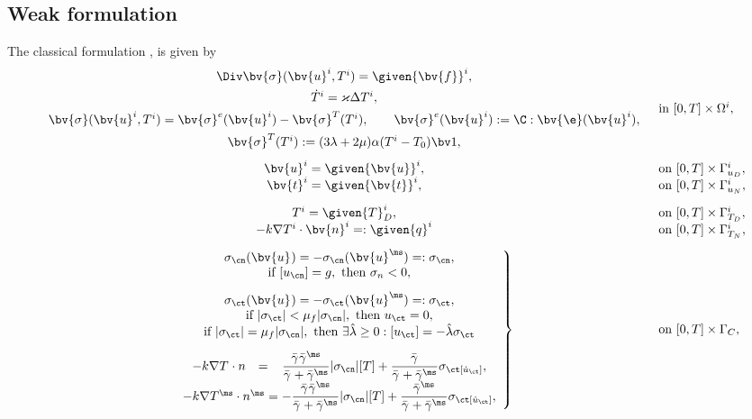 \subsection{Weak formulation} \label{sec:Weak}
The classical formulation \cite{JoKl93}, \cite{WrMi94} is given by
\begin{equation} \label{ClassicalForm}
  \begin{array}{cl}
   \begin{array}{c}
    \Div \bv{\sigma} (\bv{u}^i, T^i) = \given{\bv{f}}^i, \\ [1ex]
    \dot T^i = \varkappa \Delta T^i,    \\[1ex]
    \bv{\sigma}(\bv{u}^i, T^i) = \bv{\sigma}^e(\bv{u}^i) - \bv{\sigma}^T(T^i), \qquad 
            \bv{\sigma}^e(\bv{u}^i) := \C:\bv{\e}(\bv{u}^i), \\[1ex]
    \bv{\sigma}^T(T^i) :=  (3 \lambda + 2 \mu) \alpha (T^i-T_0) \bv 1,
   \end{array}  &\mbox{in } [0,T]\times\Omega^i, \\[8ex]
    \bv{u}^i = \given{\bv{u}}^i,&\mbox{on }[0,T]\times\Gamma_{u_D}^i, \\
    \bv{t}^i = \given{\bv{t}}^i,&\mbox{on }[0,T]\times\Gamma_{u_N}^i, \\[2ex]
    T^i = \given{T}_D^i,&\mbox{on }[0,T]\times\Gamma_{T_D}^i, \\
    -k\nabla T^i \cdot \bv{n}^i =: \given{q}^i&\mbox{on }[0,T]\times\Gamma_{T_N}^i, \\[2ex]
\left. 
   \begin{array}{c}
    \sigma_\cn(\bv{u}^{\sl})=-\sigma_\cn(\bv{u}^{\ms})=:\sigma_\cn, \\
    \mbox{if } [u_{\cn}]=g, \mbox{ then } \sigma_n < 0, \\[2ex]
    \sigma_\ct(\bv{u}^{\sl})=-\sigma_\ct(\bv{u}^{\ms})=:\sigma_\ct, \\
    \mbox{if } |\sigma_\ct| < \mu_f |\sigma_\cn|, \mbox{ then } u_\ct = 0,\\
    \mbox{if } |\sigma_\ct| = \mu_f |\sigma_\cn|, \mbox{ then } \exists \hat \lambda \geq 0: [u_\ct] = - \hat \lambda \sigma_\ct \\[2ex]
    -k\nabla T^{\sl} \cdot n^{\sl} \,\,\,\,
      = \,\,\,\,\, \dfrac{\bar{\gamma}^{\sl} \bar{\gamma}^{\ms}}{\bar{\gamma}^{\sl} + \bar{\gamma}^{\ms}} |\sigma_\cn| [T] 
        + \dfrac{\bar{\gamma}^{\sl}}{\bar{\gamma}^{\sl} + \bar{\gamma}^{\ms}} \sigma_\ct [\dot u_\ct], \\
    -k\nabla T^{\ms} \cdot n^{\ms} 
      = - \dfrac{\bar{\gamma}^{\sl} \bar{\gamma}^{\ms}}{\bar{\gamma}^{\sl} + \bar{\gamma}^{\ms}} |\sigma_\cn| [T] 
        + \dfrac{\bar{\gamma}^{\ms}}{\bar{\gamma}^{\sl} + \bar{\gamma}^{\ms}} \sigma_\ct [\dot u_\ct],
    \end{array} \right\rbrace &\mbox{on }[0,T]\times\Gamma_C,
    \end{array}
\end{equation}
